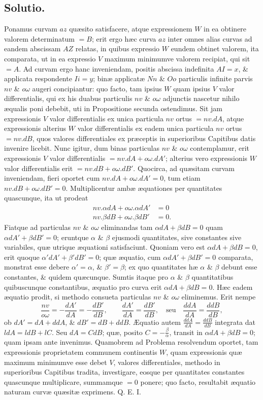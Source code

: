 \subsection*{Solutio.}
Ponamus curvam $az$ quæsito satisfacere, atque expressionem $W$ in ea obtinere valorem determinatum $=B$; erit ergo hæc curva $az$ inter omnes alias curvas ad eandem abscissam $AZ$ relatas, in quibus expressio $W$ eundem obtinet valorem, ita comparata, ut in ea expressio $V$ maximum minimumve valorem recipiat, qui sit $=A$. Ad curvam ergo hanc inveniendam, positis abscissa indefinita $AI=x$, \& applicata respondente $Ii=y$; binæ applicatæ $Nn$ \& $Oo$ particulis infinite parvis $nv$ \& $o\omega$ augeri concipiantur: quo facto, tam ipsius $W$ quam ipsius $V$ valor differentialis, qui ex his duabus particulis $nv$ \& $o\omega$ adjunctis nascetur nihilo æqualis poni debebit, uti in Propositione secunda ostendimus. Sit jam expressionis $V$ valor differentialis ex unica particula $nv$ ortus $=nv.dA$, atque expressionis alterius $W$ valor differentialis ex eadem unica particula $nv$ ortus $=nv.dB$, quos valores differentiales ex præceptis in superioribus Capitibus datis invenire licebit. Nunc igitur, dum binas particulas $nv$ \& $o\omega$ contemplamur, erit expressionis $V$ valor differentialis $=nv.dA+o\omega.dA'$; alterius vero expressionis $W$ valor differentialis erit $=nv.dB+o\omega.dB'$. Quocirca, ad quæsitam curvam inveniendam, fieri oportet cum $nv.dA+o\omega.dA'=0$, tum etiam $nv.dB+o\omega.dB'=0$. Multiplicentur ambæ æquationes per quantitates quascunque, ita ut prodeat
\[
\begin{aligned}
nv.\alpha dA+o\omega.\alpha dA'&=0\\
nv.\beta dB+o\omega.\beta dB'&=0.
\end{aligned}
\]
Fiatque ad particulas $nv$ \& $o\omega$ eliminandas tam $\alpha dA+\beta dB=0$ quam $\alpha dA'+\beta dB'=0$; eruntque $\alpha$ \& $\beta$ ejusmodi quantitates, sive constantes sive variabiles, quæ utrique æquationi satisfaciunt. Quoniam vero est $\alpha dA+\beta dB=0$, erit quoque $\alpha'dA'+\beta'dB'=0$; quæ æquatio, cum $\alpha dA'+\beta dB'=0$ comparata, monstrat esse debere $\alpha'=\alpha$, \& $\beta'=\beta$; ex quo quantitates hæ $\alpha$ \& $\beta$ debunt esse constantes, \& quidem quæcunque. Sumtis itaque pro $\alpha$ \& $\beta$ quantitatibus quibuscunque constantibus, æquatio pro curva erit $\alpha dA+\beta dB=0$. Hæc eadem æquatio prodit, si methodo consueta particulas $nv$ \& $o\omega$ eliminemus. Erit nempe
\[
\frac{nv}{o\omega}=-\frac{dA'}{dA}=-\frac{dB'}{dB},\qquad
\frac{dA'}{dA}=\frac{dB'}{dB},\quad\text{seu}\quad\frac{ddA}{dA}=\frac{ddB}{dB},
\]
ob $dA'=dA+ddA$, \& $dB'=dB+ddB$. Æquatio autem $\frac{ddA}{dA}=\frac{ddB}{dB}$ integrata dat $ldA=ldB+lC$. Seu $dA=
CdB$; quæ, posito $C=-\frac{\beta}{\alpha}$, transit in $\alpha dA+\beta dB=0$; quam ipsam ante invenimus. Quamobrem ad Problema resolvendum oportet, tam expressionis proprietatem communem continentis $W$, quam expressionis quæ maximum minimumve esse debet $V$, valores differentiales, methodo in superioribus Capitibus tradita, investigare, eosque per quantitates constantes quascunque multiplicare, summamque $=0$ ponere; quo facto, resultabit æquatio naturam curvæ quæsitæ exprimens. Q. E. I.

